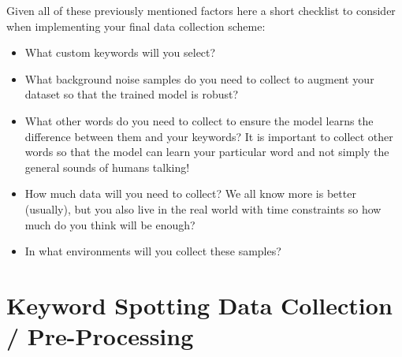 Given all of these previously mentioned factors here a short checklist to consider when implementing your final data collection scheme:

\begin{itemize}
    \item What custom keywords will you select?
    \item What background noise samples do you need to collect to augment your dataset so that the trained model is robust?
    \item What other words do you need to collect to ensure the model learns the difference between them and your keywords? It is important to collect other words so that the model can learn your particular word and not simply the general sounds of humans talking!
    \item How much data will you need to collect? We all know more is better (usually), but you also live in the real world with time constraints so how much do you think will be enough?
    \item In what environments will you collect these samples?
\end{itemize}


\section{Keyword Spotting Data Collection / Pre-Processing}

